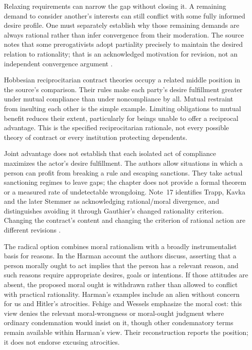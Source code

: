 Relaxing requirements can narrow the gap without closing it. A
remaining demand to consider another's interests can still conflict
with some fully informed desire profile. One must separately
establish why those remaining demands are always rational rather
than infer convergence from their moderation. The source notes that
some prerogativists adopt partiality precisely to maintain the desired
relation to rationality; that is an acknowledged motivation for
revision, not an independent convergence argument
\parencite[pp.~686--687 and n.~16]{FehigeWessels2021Morality}.

Hobbesian reciprocitarian contract theories occupy a related middle
position in the source's comparison. Their rules make each party's
desire fulfillment greater under mutual compliance than under
noncompliance by all. Mutual restraint from insulting each other is
the simple example. Limiting obligations to mutual benefit reduces
their extent, particularly for beings unable to offer a reciprocal
advantage. This is the specified reciprocitarian rationale, not
every possible theory of contract or every institution protecting
dependents.

Joint advantage does not establish that each isolated act of
compliance maximizes the actor's desire fulfillment. The authors
allow situations in which a person can profit from breaking a
rule and escaping sanctions. They take actual sanctioning regimes
to leave gaps; the chapter does not provide a formal theorem or
a measured rate of undetectable wrongdoing. Note~17 identifies
Trapp, Kavka and the later Stemmer as acknowledging rational/moral
divergence, and distinguishes avoiding it through Gauthier's changed
rationality criterion. Changing the contract's content and changing
the criterion of rational action are different revisions
\parencite[p.~687 and n.~17]{FehigeWessels2021Morality}.

The radical option combines moral rationalism with a broadly
instrumentalist basis for reasons. In the Harman account the
authors discuss, asserting that a person morally ought to act
implies that the person has a relevant reason, and such reasons
require appropriate desires, goals or intentions. If those attitudes
are absent, the proposed moral ought is withdrawn rather than
allowed to conflict with practical rationality. Harman's examples
include an alien without concern for us and Hitler's atrocities.
Fehige and Wessels emphasize the moral cost: this view denies
the relevant moral-wrongness or moral-ought judgment where ordinary
condemnation would insist on it, though other condemnatory terms
remain available within Harman's view. Their reconstruction reports
the position; it does not endorse excusing atrocities.

